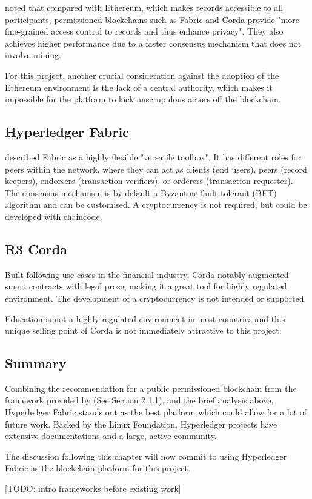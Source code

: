 \citet[p.3-4]{valenta2017comparison} noted that compared with Ethereum, which makes records accessible 
to all participants, permissioned blockchains such as Fabric and Corda provide "more fine-grained access 
control to records and thus enhance privacy". 
They also achieves higher performance due to a faster consensus mechanism that does not involve mining.

For this project, another crucial consideration against the adoption of the Ethereum environment is the 
lack of a central authority, which makes it impossible for the platform to kick unscrupulous actors off 
the blockchain.

\subsection*{Hyperledger Fabric}

\citet[p.7]{valenta2017comparison} described Fabric as a highly flexible "versatile toolbox". It 
has different roles for peers within the network, where they can act as clients (end users), peers 
(record keepers), endorsers (transaction verifiers), or orderers (transaction requester). The 
consensus mechanism is by default a Byzantine fault-tolerant (BFT) algorithm and can be customised. 
A cryptocurrency is not required, but could be developed with chaincode.

\subsection*{R3 Corda}

Built following use cases in the financial industry, Corda notably augmented smart contracts 
with legal prose, making it a great tool for highly regulated environment. The development of 
a cryptocurrency is not intended or supported. \citep{valenta2017comparison}

Education is not a highly regulated environment in most countries and this unique selling point of 
Corda is not immediately attractive to this project.

\subsection*{Summary}

Combining the recommendation for a public permissioned blockchain from the framework provided 
by \citet{wust2017you} (See Section 2.1.1), and the brief analysis above, Hyperledger Fabric 
stands out as the best platform which could allow for a lot of future work. Backed by the 
Linux Foundation, Hyperledger projects have extensive documentations and a large, 
active community. 

The discussion following this chapter will now commit to using Hyperledger 
Fabric as the blockchain platform for this project.

[TODO: intro frameworks before existing work]

